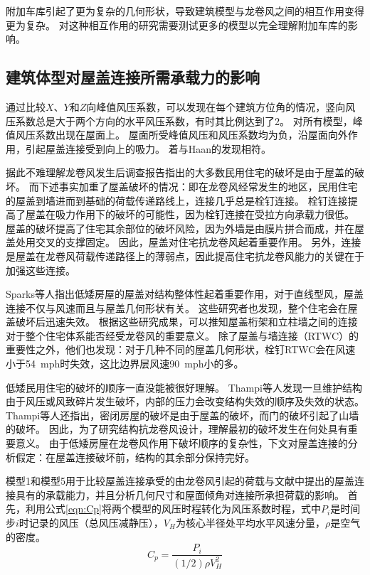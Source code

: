 \documentclass{ctexart}
\begin{document}
附加车库引起了更为复杂的几何形状，导致建筑模型与龙卷风之间的相互作用变得更为复杂。
对这种相互作用的研究需要测试更多的模型以完全理解附加车库的影响。

\subsection{建筑体型对屋盖连接所需承载力的影响}
通过比较$X$、$Y$和$Z$向峰值风压系数，可以发现在每个建筑方位角的情况，竖向风压系数总是大于两个方向的水平风压系数，有时其比例达到了\num{2}。
对所有模型，峰值风压系数出现在屋面上。
屋面所受峰值风压和风压系数均为负，沿屋面向外作用，引起屋盖连接受到向上的吸力。
着与Haan\cite{haan2009tornado}的发现相符。

据此不难理解龙卷风发生后调查报告指出的大多数民用住宅的破坏是由于屋盖的破坏。
而下述事实加重了屋盖破坏的情况：即在龙卷风经常发生的地区，民用住宅的屋盖到墙进而到基础的荷载传递路线上，连接几乎总是栓钉连接。
栓钉连接提高了屋盖在吸力作用下的破坏的可能性，因为栓钉连接在受拉方向承载力很低。
屋盖的破坏提高了住宅其余部位的破坏风险，因为外墙是由膜片拼合而成，并在屋盖处用交叉的支撑固定\cite{marshall2002tornado}。
因此，屋盖对住宅抗龙卷风起着重要作用。
另外，连接是屋盖在龙卷风荷载传递路径上的薄弱点，因此提高住宅抗龙卷风能力的关键在于加强这些连接。

Sparks等人\cite{sparks1988failure}指出低矮房屋的屋盖对结构整体性起着重要作用，对于直线型风，屋盖连接不仅与风速而且与屋盖几何形状有关。
这些研究者也发现，整个住宅会在屋盖破坏后迅速失效。
根据这些研究成果，可以推知屋盖桁架和立柱墙之间的连接对于整个住宅体系能否经受龙卷风的重要意义\cite{sparks1988failure}。
除了屋盖与墙连接（RTWC）的重要性之外，他们也发现：对于几种不同的屋盖几何形状，栓钉RTWC会在风速小于\SI{54}{mph}时失效，这比边界层风速\SI{90}{mph}小的多。

低矮民用住宅的破坏的顺序一直没能被很好理解。
Thampi等人\cite{thampi2011finite}发现一旦维护结构由于风压或风致碎片发生破坏，内部的压力会改变结构失效的顺序及失效的状态。
Thampi等人\cite{thampi2011finite}还指出，密闭房屋的破坏是由于屋盖的破坏，而门的破坏引起了山墙的破坏。
因此，为了研究结构抗龙卷风设计，理解最初的破坏发生在何处具有重要意义。
由于低矮房屋在龙卷风作用下破坏顺序的复杂性，下文对屋盖连接的分析假定：在屋盖连接破坏前，结构的其余部分保持完好。

模型1和模型5用于比较屋盖连接承受的由龙卷风引起的荷载与文献中提出的屋盖连接具有的承载能力，并且分析几何尺寸和屋面倾角对连接所承担荷载的影响。
首先，利用公式\eqref{eqn:Cp}将两个模型的风压时程转化为风压系数时程，式中$P_i$是时间步$i$时记录的风压（总风压减静压），$V_H$为核心半径处平均水平风速分量，$\rho$是空气的密度。
\begin{equation} \label{eqn:Cp}
C_p=\frac{P_i}{(1/2) \rho V_H^2}
\end{equation}
\end{document}
